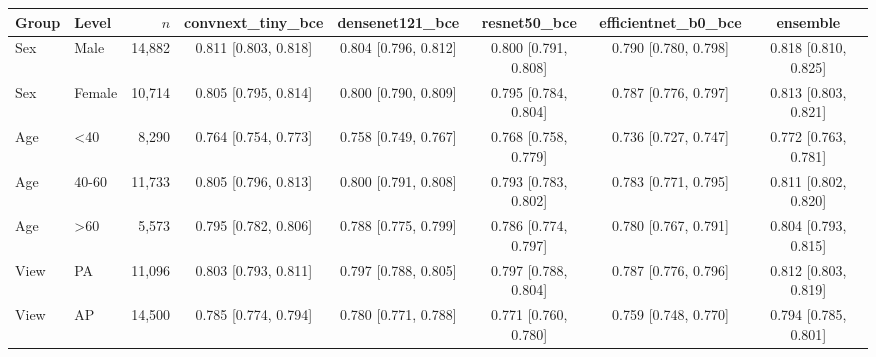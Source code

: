 \begin{tabular}{ll rccccc}
\toprule
Group & Level & $n$ & convnext\_tiny\_bce & densenet121\_bce & resnet50\_bce & efficientnet\_b0\_bce & ensemble \\
\midrule
Sex & Male & 14,882 & 0.811 [0.803, 0.818] & 0.804 [0.796, 0.812] & 0.800 [0.791, 0.808] & 0.790 [0.780, 0.798] & 0.818 [0.810, 0.825] \\
Sex & Female & 10,714 & 0.805 [0.795, 0.814] & 0.800 [0.790, 0.809] & 0.795 [0.784, 0.804] & 0.787 [0.776, 0.797] & 0.813 [0.803, 0.821] \\
Age & <40 & 8,290 & 0.764 [0.754, 0.773] & 0.758 [0.749, 0.767] & 0.768 [0.758, 0.779] & 0.736 [0.727, 0.747] & 0.772 [0.763, 0.781] \\
Age & 40-60 & 11,733 & 0.805 [0.796, 0.813] & 0.800 [0.791, 0.808] & 0.793 [0.783, 0.802] & 0.783 [0.771, 0.795] & 0.811 [0.802, 0.820] \\
Age & >60 & 5,573 & 0.795 [0.782, 0.806] & 0.788 [0.775, 0.799] & 0.786 [0.774, 0.797] & 0.780 [0.767, 0.791] & 0.804 [0.793, 0.815] \\
View & PA & 11,096 & 0.803 [0.793, 0.811] & 0.797 [0.788, 0.805] & 0.797 [0.788, 0.804] & 0.787 [0.776, 0.796] & 0.812 [0.803, 0.819] \\
View & AP & 14,500 & 0.785 [0.774, 0.794] & 0.780 [0.771, 0.788] & 0.771 [0.760, 0.780] & 0.759 [0.748, 0.770] & 0.794 [0.785, 0.801] \\
\bottomrule
\end{tabular}
